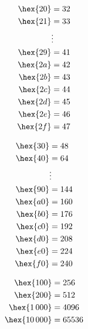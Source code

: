 \begin{minipage}[t]{0.18\linewidth}
\footnotesize{}
\begin{align*}
\hex{20} &= 32\\
\hex{21} &= 33\\
&\vdots\\
\hex{29} &= 41\\
\hex{2a} &= 42\\
\hex{2b} &= 43\\
\hex{2c} &= 44\\
\hex{2d} &= 45\\
\hex{2e} &= 46\\
\hex{2f} &= 47\\
\end{align*}
\end{minipage}
\begin{minipage}[t]{0.18\linewidth}
\footnotesize{}
\begin{align*}
\hex{30} &= 48\\
\hex{40} &= 64\\
&\vdots\\
\hex{90} &= 144\\
\hex{a0} &= 160\\
\hex{b0} &= 176\\
\hex{c0} &= 192\\
\hex{d0} &= 208\\
\hex{e0} &= 224\\
\hex{f0} &= 240\\
\end{align*}
\end{minipage}
\begin{minipage}[t]{0.18\linewidth}
\footnotesize{}
\begin{align*}
\hex{100} &= 256\\
\hex{200} &= 512\\
\hex{1\,000} &= 4096\\
\hex{10\,000} &= 65536\\
\end{align*}
\end{minipage}

%
%


